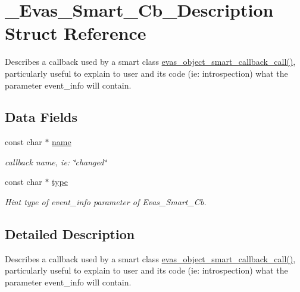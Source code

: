\section{\_\-Evas\_\-Smart\_\-Cb\_\-Description Struct Reference}
\label{struct__Evas__Smart__Cb__Description}


Describes a callback used by a smart class \hyperlink{group__Evas__Smart__Object__Group_ga17bbe660f5bf9d8997913b08882f6f9e}{evas\_\-object\_\-smart\_\-callback\_\-call()}, particularly useful to explain to user and its code (ie: introspection) what the parameter {\ttfamily event\_\-info} will contain.  


\subsection*{Data Fields}
\begin{DoxyCompactItemize}
\item 
const char $\ast$ \hyperlink{struct__Evas__Smart__Cb__Description_ab377859f4cfcf1c2dd3c149a76b70b53}{name}\label{struct__Evas__Smart__Cb__Description_ab377859f4cfcf1c2dd3c149a76b70b53}

\begin{DoxyCompactList}\small\item\em callback name, ie: \char`\"{}changed\char`\"{} \item\end{DoxyCompactList}\item 
const char $\ast$ \hyperlink{struct__Evas__Smart__Cb__Description_af0d4ce3d62a068eab1b89a34abb056ad}{type}
\begin{DoxyCompactList}\small\item\em Hint type of {\ttfamily event\_\-info} parameter of Evas\_\-Smart\_\-Cb. \item\end{DoxyCompactList}\end{DoxyCompactItemize}


\subsection{Detailed Description}
Describes a callback used by a smart class \hyperlink{group__Evas__Smart__Object__Group_ga17bbe660f5bf9d8997913b08882f6f9e}{evas\_\-object\_\-smart\_\-callback\_\-call()}, particularly useful to explain to user and its code (ie: introspection) what the parameter {\ttfamily event\_\-info} will contain. 

